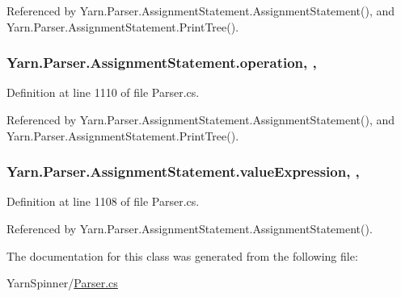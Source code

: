 Referenced by Yarn.\-Parser.\-Assignment\-Statement.\-Assignment\-Statement(), and Yarn.\-Parser.\-Assignment\-Statement.\-Print\-Tree().

\hypertarget{a00033_a896df0f23b44e9f20036150b3527d9e5}{
\subsubsection[{operation}]{ Yarn.\-Parser.\-Assignment\-Statement.\-operation\hspace{0.3cm}{\ttfamily [get]}, {\ttfamily [set]}, {\ttfamily [package]}}}\label{a00033_a896df0f23b44e9f20036150b3527d9e5}


Definition at line 1110 of file Parser.\-cs.



Referenced by Yarn.\-Parser.\-Assignment\-Statement.\-Assignment\-Statement(), and Yarn.\-Parser.\-Assignment\-Statement.\-Print\-Tree().

\hypertarget{a00033_a7ada366012cacd98436db80227ee65f5}{
\subsubsection[{value\-Expression}]{ Yarn.\-Parser.\-Assignment\-Statement.\-value\-Expression\hspace{0.3cm}{\ttfamily [get]}, {\ttfamily [set]}, {\ttfamily [package]}}}\label{a00033_a7ada366012cacd98436db80227ee65f5}


Definition at line 1108 of file Parser.\-cs.



Referenced by Yarn.\-Parser.\-Assignment\-Statement.\-Assignment\-Statement().



The documentation for this class was generated from the following file\-:\begin{DoxyCompactItemize}
\item 
Yarn\-Spinner/\hyperlink{a00301}{Parser.\-cs}\end{DoxyCompactItemize}
